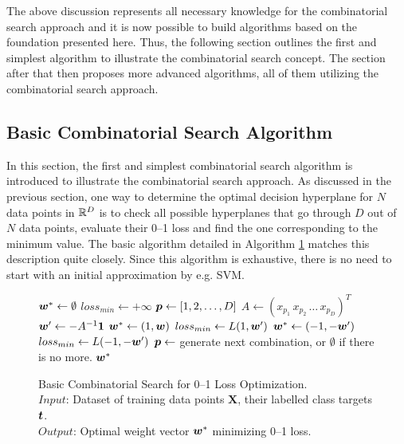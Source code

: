 The above discussion represents all necessary knowledge for the combinatorial search approach and it is now possible to build algorithms based on the foundation presented here. Thus, the following section outlines the first and simplest algorithm to illustrate the combinatorial search concept. The section after that then proposes more advanced algorithms, all of them utilizing the combinatorial search approach.   

\subsection{Basic Combinatorial Search Algorithm}
\label{sec:cs.basic}

In this section, the first  and simplest combinatorial search algorithm is introduced to illustrate the combinatorial search approach. As discussed in the previous section, one way to determine the optimal decision hyperplane for $N$ data points in $\mathbb{R}^D$ is to check all possible hyperplanes that go through $D$ out of $N$ data points, evaluate their 0--1 loss and find the one corresponding to the minimum value. The basic algorithm detailed in Algorithm \ref{alg:cs.basic} matches this description quite closely. Since this algorithm is exhaustive, there is no need to start with an initial approximation by e.g. SVM. 

\begin{figure}
\caption{
Basic Combinatorial Search for 0--1 Loss Optimization. \\
\text{\hspace{2.1cm}} $Input$: Dataset of training data points $ \boldsymbol{X}$, their labelled class targets $\boldsymbol{t}$. \\
\text{\hspace{2.1cm}} $Output$: Optimal weight vector $\boldsymbol{w}^*$ minimizing 0--1 loss.
}
\label{alg:cs.basic}
\begin{algorithmic}[1]
 
\State $\boldsymbol{w}^* \gets \emptyset$
\State $loss_{min} \gets +\infty$
\State $\boldsymbol{p} \gets [1,2,\dots,D]$
\While{$\p \not= \emptyset$}
   \State $A \gets (x_{p_1} \, x_{p_2} \, \dots \, x_{p_D})^T$
   \State $\boldsymbol{w}' \gets -A^{-1} \boldsymbol{1}$
      \State $\boldsymbol{w}^* \gets (1, \boldsymbol{w})$
      \State $loss_{min} \gets L(1,\boldsymbol{w}')$
   \EndIf
      \State $\boldsymbol{w}^* \gets (-1, -\boldsymbol{w}')$
      \State $loss_{min} \gets L(-1,-\boldsymbol{w}')$
   \EndIf
   \State $\boldsymbol{p} \gets $ generate next combination, or $\emptyset$ if there is no more.
\EndWhile
\State \Return $\boldsymbol{w}^*$
\EndFunction
\end{algorithmic}
\end{figure}

